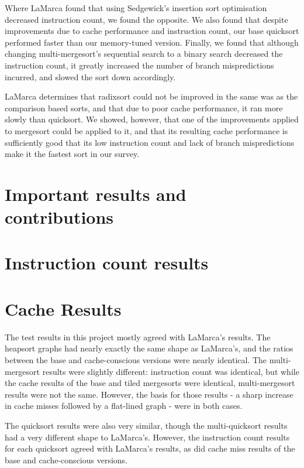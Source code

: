 Where LaMarca found that using Sedgewick's insertion sort optimisation decreased
instruction count, we found the opposite. We also found that despite
improvements due to cache performance and instruction count, our base quicksort
performed faster than our memory-tuned version. Finally, we found that although
changing multi-mergesort's sequential search to a binary search decreased the
instruction count, it greatly increased the number of branch mispredictions
incurred, and slowed the sort down accordingly.

LaMarca determines that radixsort could not be improved in the same was as the
comparison based sorts, and that due to poor cache performance, it ran more
slowly than quicksort. We showed, however, that one of the improvements applied
to mergesort could be applied to it, and that its resulting cache performance is
sufficiently good that its low instruction count and lack of branch
mispredictions make it the fastest sort in our survey.


\section{Important results and contributions}


\section{Instruction count results}

\section{Cache Results}

The test results in this project mostly agreed with LaMarca's results.  The
heapsort graphs had nearly exactly the same shape as LaMarca's, and the ratios
between the base and cache-conscious versions were nearly identical. The
multi-mergesort results were slightly different: instruction count was
identical, but while the cache results of the base and tiled mergesorts were
identical, multi-mergesort results were not the same. However, the basis for
those results - a sharp increase in cache misses followed by a flat-lined graph
- were in both cases.

The quicksort results were also very similar, though the multi-quicksort results
had a very different shape to LaMarca's. However, the instruction count
results for each quicksort agreed with LaMarca's results, as did cache miss
results of the base and cache-conscious versions.

